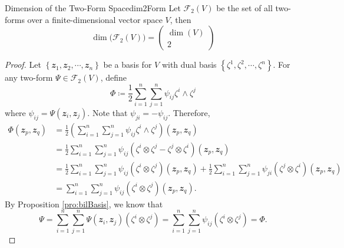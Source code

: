 \documentclass[math]{amznotes}
\theoremstyle{remark}
\begin{document}
\begin{probox}{Dimension of the Two-Form Space}{dim2Form}
    Let $\mathcal{F}_2(V)$ be the set of all two-forms over a finite-dimensional vector space $V$, then 
    \begin{equation*}
        \dim\bigl(\mathcal{F}_2(V)\bigr) = \begin{pmatrix}
            \dim(V) \\ 
            2
        \end{pmatrix}
    \end{equation*}
    \tcblower
    \begin{proof}
        Let $\left\{\mathbfit{z}_1, \mathbfit{z}_2, \cdots, \mathbfit{z}_n\right\}$ be a basis for $V$ with dual basis $\left\{\zeta^1, \zeta^2, \cdots, \zeta^n\right\}$. For any two-form $\Psi \in \mathcal{F}_2(V)$, define
        \begin{equation*}
            \Phi \coloneqq \frac{1}{2}\sum_{i = 1}^{n}\sum_{j = 1}^{n}\psi_{ij}\zeta^i\wedge\zeta^j
        \end{equation*}
        where $\psi_{ij} = \Psi\left(\mathbfit{z}_i, \mathbfit{z}_j\right)$. Note that $\psi_{ji} = -\psi_{ij}$. Therefore, 
        \begin{align*}
            \Phi\left(\mathbfit{z}_p, \mathbfit{z}_q\right) & = \frac{1}{2}\left(\sum_{i = 1}^{n}\sum_{j = 1}^{n}\psi_{ij}\zeta^i\wedge\zeta^j\right)\left(\mathbfit{z}_p, \mathbfit{z}_q\right) \\
            & = \frac{1}{2}\sum_{i = 1}^{n}\sum_{j = 1}^{n}\psi_{ij}\left(\zeta^i\otimes\zeta^j - \zeta^j\otimes\zeta^i\right)\left(\mathbfit{z}_p, \mathbfit{z}_q\right) \\
            & = \frac{1}{2}\sum_{i = 1}^{n}\sum_{j = 1}^{n}\psi_{ij}\left(\zeta^i\otimes\zeta^j\right)\left(\mathbfit{z}_p, \mathbfit{z}_q\right) + \frac{1}{2}\sum_{i = 1}^{n}\sum_{j = 1}^{n}\psi_{ji}\left(\zeta^j\otimes\zeta^i\right)\left(\mathbfit{z}_p, \mathbfit{z}_q\right) \\
            & = \sum_{i = 1}^{n}\sum_{j = 1}^{n}\psi_{ij}\left(\zeta^i\otimes\zeta^j\right)\left(\mathbfit{z}_p, \mathbfit{z}_q\right).
        \end{align*}
        By Proposition \ref{pro:bilBasis}, we know that 
        \begin{equation*}
            \Psi = \sum_{i = 1}^{n}\sum_{j = 1}^{n}\Psi\left(\mathbfit{z}_i, \mathbfit{z}_j\right)\left(\zeta^i\otimes\zeta^j\right) = \sum_{i = 1}^{n}\sum_{j = 1}^{n}\psi_{ij}\left(\zeta^i\otimes\zeta^j\right) = \Phi.
        \end{equation*}

\end{proof}
\end{probox}
\end{document}
